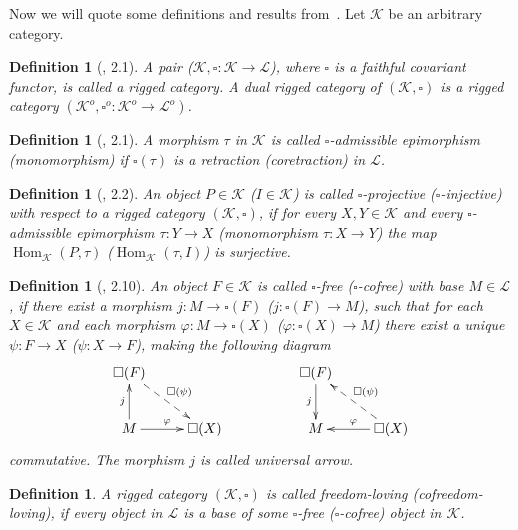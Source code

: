 \documentclass[12pt]{article}
\newtheorem{definition}[theorem]{Definition}
\begin{document}
Now we will quote some definitions and results from~\cite{HelMetrFrQmod}. 
Let $\mathcal{K}$ be an arbitrary category.
\begin{definition}[\cite{HelMetrFrQmod}, 2.1]\label{DefRigCat}
A pair ($\mathcal{K}, \square:\mathcal{K}\to\mathcal{L}$), where $\square$ is 
a faithful covariant functor, is called a rigged category. A dual rigged 
category of $(\mathcal{K}, \square)$ 
is a rigged category 
$(\mathcal{K}^{o},\square^{o}:\mathcal{K}^{o}\to\mathcal{L}^{o})$. 
\end{definition}
\begin{definition}[\cite{HelMetrFrQmod}, 2.1]\label{DefAdmMorph}
A morphism $\tau$ in $\mathcal{K}$ is called $\square$-admissible epimorphism 
(monomorphism) if $\square (\tau)$ is a retraction 
(coretraction) in $\mathcal{L}$.
\end{definition}
\begin{definition}[\cite{HelMetrFrQmod}, 2.2]\label{DefProjInj}
An object $P\in \mathcal{K}$ ($I \in \mathcal{K}$) is called 
$\square$-projective ($\square$-injective) with respect to a rigged category 
$(\mathcal{K}, \square)$, if for every $X,Y\in\mathcal{K}$ and every 
$\square$-admissible epimorphism $\tau : Y \to X$ (monomorphism 
$\tau : X \to Y$)  the map $\operatorname{Hom}_{\mathcal{K}}(P,\tau)$ 
($\operatorname{Hom}_{\mathcal{K}}(\tau, I)$) is surjective.
\end{definition}
\begin{definition}[\cite{HelMetrFrQmod}, 2.10]\label{DefFrAndCoFr}
An object $F \in \mathcal{K}$ is called $\square$-free ($\square$-cofree) 
with base $M \in \mathcal{L}$, if there exist a morphism 
$j : M \to \square(F)$ ($j : \square(F) \to M$), 
such that for each $X \in \mathcal{K}$ and each morphism 
$\varphi : M \to \square(X)$ ($\varphi : \square(X) \to M$) there exist 
a unique $\psi : F \to X$ ($\psi : X \to F$), 
making the following diagram
$$
\xymatrix{{\square (F)} \ar@{-->}[dr]^{\square (\psi)} & \\  %
{M} \ar[u]^{j} \ar[r]^{\varphi} &{\square (X)}} \qquad\qquad\quad  %
\xymatrix{{\square (F)} \ar[d]_{j} & \\  %
{M} &{\square (X)} \ar[l]_\varphi \ar@{-->}[ul]_{\square(\psi)}}  %
$$
commutative. The morphism $j$ is called universal arrow.
\end{definition}
\begin{definition}\label{DefFrAndCoFrLove}
A rigged category $(\mathcal{K},\square)$ is called freedom-loving 
(cofreedom-loving), if every object in $\mathcal{L}$ is a base of some 
$\square$-free ($\square$-cofree) object in $\mathcal{K}$.
\end{definition}
\end{document}
